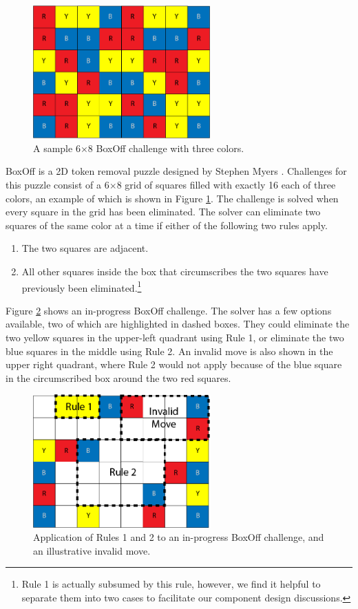 \documentclass[journal]{IEEEtran}
\begin{document}
\begin{figure}[t]
\centering
\includegraphics[width=6.8cm]{boxoff6x83.png}
\caption{A sample 6$\times$8 BoxOff challenge with three colors.}
\label{fig:boxoffbig}
\end{figure}
\noindent
BoxOff is a 2D token removal puzzle designed by Stephen Myers  \cite{BoxOffGAMES}. Challenges for this puzzle consist of a 6$\times$8 grid of squares filled with exactly 16 each of three colors, an example of which is shown in 
Figure \ref{fig:boxoffbig}. The challenge is solved when every square in the grid has been eliminated.  The solver can eliminate two squares of the same color at a time if either of the following two rules apply.
\begin{enumerate}
    \item The two squares are adjacent.
    \item All other squares inside the box that circumscribes the two squares have previously been eliminated.\footnote{Rule 1 is actually subsumed by this rule, however, we find it helpful to separate them into two cases to facilitate our component design discussions.}
\end{enumerate}

Figure \ref{fig:boxoffrules} shows an in-progress BoxOff challenge. The solver has a few options available, two of which are highlighted in dashed boxes. They could eliminate the two yellow squares in the upper-left quadrant using Rule 1, or eliminate the two blue squares in the middle using Rule 2. An invalid move is also shown in the upper right quadrant, where Rule 2 would not apply because of the blue square in the circumscribed box around the two red squares.

\begin{figure}[t]
\centering
\includegraphics[width=6.8cm]{boxoffrules1.png}
\caption{Application of Rules 1 and 2 to an in-progress BoxOff challenge, and an illustrative invalid move.}
\label{fig:boxoffrules}
\end{figure}
\end{document}
